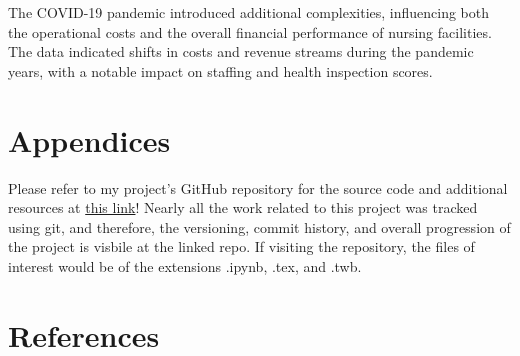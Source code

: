 \documentclass{article}
\theoremstyle{mytheoremstyle}
\theoremstyle{mytheoremstyle}
\theoremstyle{myproblemstyle}
\begin{document}
The COVID-19 pandemic introduced additional complexities, influencing both the operational costs and the overall financial performance of nursing facilities. The data indicated shifts in costs and revenue streams during the pandemic years, with a notable impact on staffing and health inspection scores.


\pagebreak
\section{Appendices}
Please refer to my project's GitHub repository for the source code and additional resources at \href{https://github.com/Musiik-fn/620-Project-Codebase}{this link}! Nearly all the work related to this project was tracked using git, and therefore, the versioning, commit history, and overall progression of the project is visbile at the linked repo. If visiting the repository, the files of interest would be of the extensions .ipynb, .tex, and .twb. 

\pagebreak
\section{References}
\end{document}
